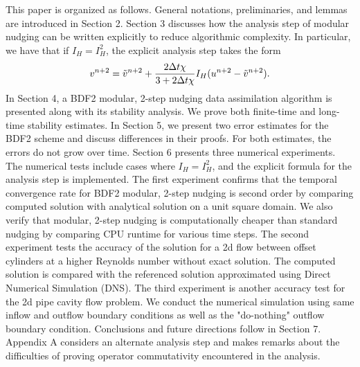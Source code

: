 \documentclass[11pt,a4paper]{article}
\begin{document}
This paper is organized as follows. General notations, preliminaries, and lemmas are introduced in Section 2. Section 3 discusses how the analysis step of modular nudging can be written explicitly to reduce algorithmic complexity. In particular, we have that if $I_H=I_H^2$, the explicit analysis step takes the form
\begin{align}
    v^{n+2}=\Tilde{v}^{n+2}+\frac{2\Delta t\chi}{3+2\Delta t\chi}I_H(u^{n+2}-\Tilde{v}^{n+2}). \notag
\end{align}
In Section 4, a BDF2 modular, 2-step nudging data assimilation algorithm is presented along with its stability analysis. We prove both finite-time and long-time stability estimates. In Section 5, we present two error estimates for the BDF2 scheme and discuss differences in their proofs. For both estimates, the errors do not grow over time. Section 6 presents three numerical experiments. The numerical tests include cases where $I_H=I_H^2$, and the explicit formula for the analysis step is implemented. 
The first experiment confirms that the  temporal convergence rate for BDF2 modular, 2-step nudging is second order by comparing computed solution with analytical solution on a unit square domain. We also verify that modular, 2-step nudging is computationally cheaper than standard nudging by comparing CPU runtime for various time steps. The second experiment tests the accuracy of the solution for a 2d flow between offset cylinders at a higher Reynolds number without exact solution. The computed solution is compared with the referenced solution approximated using Direct Numerical Simulation (DNS). The third experiment is another accuracy test for the 2d pipe cavity flow problem. We conduct the numerical simulation using same inflow and outflow boundary conditions as well as the "do-nothing" outflow boundary condition. Conclusions and future directions follow in Section 7. Appendix A considers an alternate analysis step and makes remarks about the difficulties of proving operator commutativity encountered in the analysis.
\end{document}

